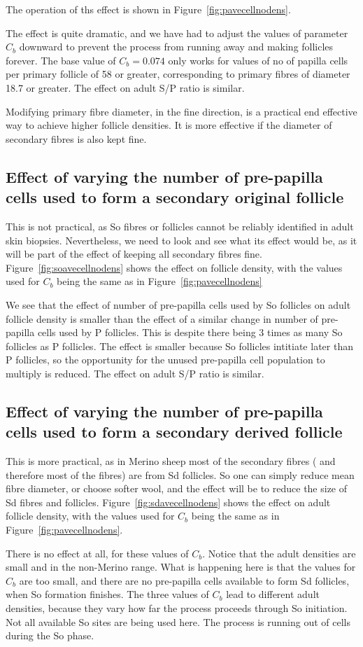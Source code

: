 \documentclass[titlepage]{article}  %
\begin{document}
The operation of ths effect is shown in Figure~\ref{fig:pavecellnodens}.

The effect is quite dramatic, and we have had to adjust the values of parameter $C_{b}$ downward to prevent the process from running away and making follicles forever. The base value of $C_{b}=0.074$ only works for values of no of papilla cells per primary follicle of 58 or greater, corresponding to primary fibres of diameter 18.7 or greater. The effect on  adult S/P ratio  is similar.

Modifying primary fibre diameter, in the fine direction, is a practical end effective way to achieve higher follicle densities. It is more effective if the diameter of secondary fibres is also kept fine.

\subsection{Effect of varying the number of pre-papilla cells used to form a secondary original follicle}
This is not practical, as So fibres or follicles cannot be reliably identified in adult skin biopsies. Nevertheless, we need to look and see what its effect would be, as it will be part of the effect of keeping all secondary fibres fine. Figure~\ref{fig:soavecellnodens} shows the effect on follicle density, with the values used for  $C_{b}$ being the same as in Figure~\ref{fig:pavecellnodens}

We see that the effect of number of pre-papilla cells used by So follicles on adult follicle density is smaller than the effect  of a similar change in number of pre-papilla cells used by P follicles.  This is despite there being 3 times as many So follicles as P follicles. The effect is smaller because So follicles intitiate later than P follicles, so the opportunity for the unused pre-papilla cell population to multiply is reduced.  The effect on adult S/P ratio is similar.

\subsection{Effect of varying the number of pre-papilla cells used to form a secondary derived follicle}
This is more practical, as in Merino sheep most of the secondary fibres ( and therefore most of the fibres) are from Sd follicles. So one can simply reduce mean fibre diameter, or choose softer wool, and the effect will be to reduce the size of Sd fibres and follicles. Figure~\ref{fig:sdavecellnodens} shows the effect on adult follicle density, with the values used for  $C_{b}$ being the same as in Figure~\ref{fig:pavecellnodens}. 

 There is no effect at all, for these values of $C_{b}$.  Notice that the adult densities are small and in the non-Merino range. What is happening here is that the values for $C_{b}$ are too small, and there are no pre-papilla cells available to form Sd follicles, when So formation finishes. The three values of $C_{b}$ lead to different adult densities, because they vary how far the process proceeds through So initiation. Not all available So sites are being used here. The process is running out of cells during the So phase.
\end{document}
